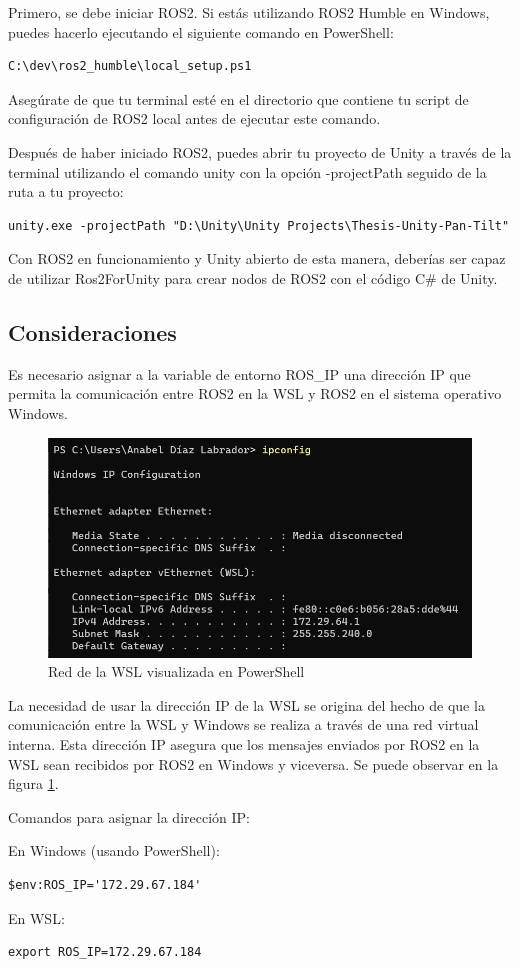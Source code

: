 Primero, se debe iniciar ROS2. Si estás utilizando ROS2 Humble en Windows, puedes hacerlo ejecutando el siguiente comando en PowerShell:

\begin{verbatim}
C:\dev\ros2_humble\local_setup.ps1
\end{verbatim}

Asegúrate de que tu terminal esté en el directorio que contiene tu script de configuración de ROS2 local antes de ejecutar este comando.

Después de haber iniciado ROS2, puedes abrir tu proyecto de Unity a través de la terminal utilizando el comando unity con la opción -projectPath seguido de la ruta a tu proyecto:

\begin{verbatim}
unity.exe -projectPath "D:\Unity\Unity Projects\Thesis-Unity-Pan-Tilt"
\end{verbatim}

Con ROS2 en funcionamiento y Unity abierto de esta manera, deberías ser capaz de utilizar Ros2ForUnity para crear nodos de ROS2 con el código C\# de Unity.


\subsection{Consideraciones}

Es necesario asignar a la variable de entorno ROS\_IP una dirección IP que permita la comunicación entre ROS2 en la WSL y ROS2 en el sistema operativo Windows.

\begin{figure}[!htb]
    \centering
    \includegraphics[width=0.8\linewidth]{figures/wsl-network-powershell.png}
    \caption{Red de la WSL visualizada en PowerShell}
    \label{figure:wsl-network-powershell}
\end{figure}



La necesidad de usar la dirección IP de la WSL se origina del hecho de que la comunicación entre la WSL y Windows se realiza a través de una red virtual interna. Esta dirección IP asegura que los mensajes enviados por ROS2 en la WSL sean recibidos por ROS2 en Windows y viceversa. Se puede observar en la figura \ref{figure:wsl-network-powershell}.



Comandos para asignar la dirección IP:



En Windows (usando PowerShell):
\begin{verbatim}
$env:ROS_IP='172.29.67.184'
\end{verbatim}


En WSL:
\begin{verbatim}
export ROS_IP=172.29.67.184
\end{verbatim}